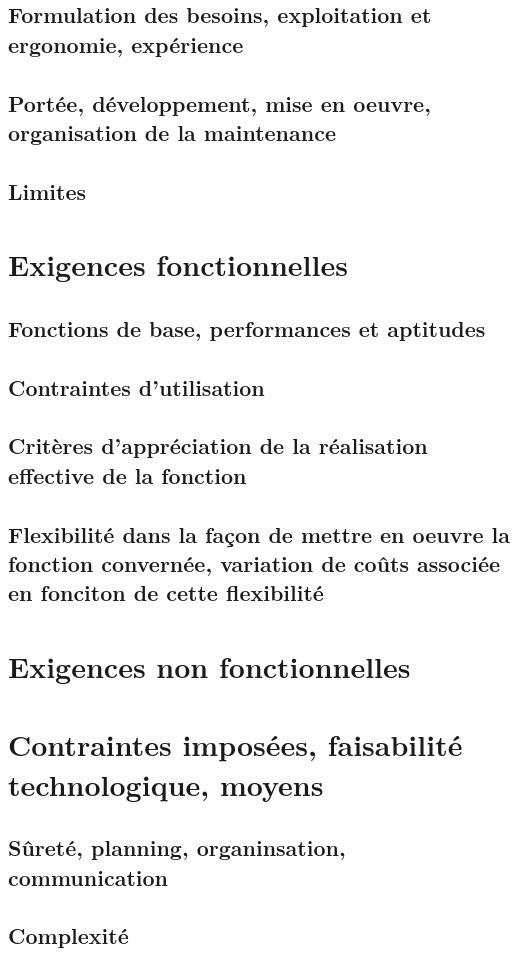 \documentclass[a4paper]{article}
\begin{document}
\subsection{Formulation des besoins, exploitation et ergonomie, expérience}
\subsection{Portée, développement, mise en oeuvre, organisation de la maintenance}
\subsection{Limites}

\section{Exigences fonctionnelles}
\subsection{Fonctions de base, performances et aptitudes}
\subsection{Contraintes d'utilisation}
\subsection{Critères d'appréciation de la réalisation effective de la fonction}
\subsection{Flexibilité dans la façon de mettre en oeuvre la fonction convernée, variation de coûts associée en fonciton de cette flexibilité}

\section{Exigences non fonctionnelles}

\section{Contraintes imposées, faisabilité technologique, moyens}
\subsection{Sûreté, planning, organinsation, communication}
\subsection{Complexité}
\end{document}

